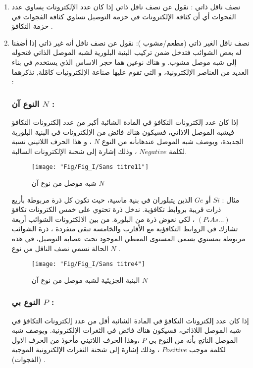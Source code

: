 \begin{enumerate}
	\item 
	نصف ناقل ذاتي : نقول عن نصف ناقل ذاتي إذا كان عدد الإلكترونات يساوي عدد الفجوات أي أن كثافة الإلكترونات في 
	حزمة التوصيل تساوي كثافة الفجوات في حزمة التكافؤ .
	\item 
	نصف ناقل الغير ذاتي (مطعم/مشوب ): نقول عن نصف ناقل أنه غير ذاتي إذا أضفنا له بعض الشوائب فتدخل ضمن تركيب البنية البلورية لشبه الموصل الذاتي فتحوله إلى شبه موصل مشوب. 
	و هناك نوعين هما حجر الاساس الذي يستخدم في بناء العديد من العناصر الإلكترونية، و التي تقوم عليها صناعة الإلكترونيات كامًلة, نذكرهما :
	
	\subsubsection*{ النوع آن $ N $ :}
	
		 إذا كان عدد إلكترونات التكافؤ في المادة الشائبة أكبر من عدد إلكترونات التكافؤ فيشبه الموصل الاذاتي، فسيكون هناك فائض من الإلكترونات في البنية البلورية الجديدة، ويوصف شبه الموصل عندهابأنه من النوع $ N $ ، و هذا الحرف اللاتيني نسبة لكلمة $ Negative $ ، وذلك إشارة إلى شحنة الإلكترونات السالبة.
		
		\begin{figure}[h]
			\centering
			\texttt{[image: "Fig/Fig\_I/Sans titre11"]}
			\caption{ شبه موصل من نوع آن $ N $ }
			\label{fig:sans-titre11}
		\end{figure}
	\FloatBarrier
		 
		مثال : $ Si $ أو $ Ge $ الذين يتبلوران في بنية ماسية، حيث تكون كل ذرة مربوطة بأربع ذرات قريبة بروابط تكافؤية. ندخل ذرة تحتوي على خمس الكترونات تكافؤ $ (P،As...) $ ، لكي نعوض ذرة من البلورة. من بين الالكترونات الشوائب أربعة تشارك في الروابط التكافؤية مع الأقارب والخامسة تبقى منفردة ، ذرة الشوائب مربوطة بمستوي يسمى المستوى المعطي الموجود تحت عصابة التوصيل، في هذه الحالة نسمي نصف الناقل من نوع $ N $ .
		
		\begin{figure}[h]
			\centering
			\texttt{[image: "Fig/Fig\_I/Sans titre4"]}
			\caption{البنية الجزيئية لشبه موصل من نوع آن $ N $}
			\label{fig:sans-titre4}
		\end{figure}
	\FloatBarrier
		
	\subsubsection*{ النوع بي $ P $ :}
	
		 إذا كان عدد إلكترونات التكافؤ في المادة الشائبة أقل من عدد إلكترونات التكافؤ في شبه الموصل اللاذاتي، فسيكون هناك فائض في الثغرات الإلكترونية. ويوصف شبه الموصل الناتج بأنه من النوع بي  $ P $ ،وهذا الحرف اللاتيني مأخوذ من الحرف الاول لكلمة موجب $ Positive $ ، وذلك إشارة إلى شحنة الثغرات الإلكترونية الموجبة (الفجوات) . \cite{a19}
		

\end{enumerate}
